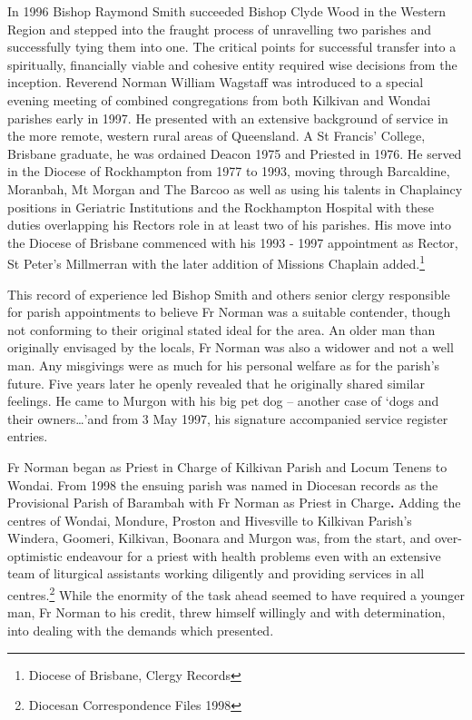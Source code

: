 In 1996 Bishop Raymond Smith succeeded Bishop Clyde Wood in the Western Region and stepped into the fraught process of unravelling two parishes and successfully tying them into one. The critical points for successful transfer into a spiritually, financially viable and cohesive entity required wise decisions from the inception. Reverend Norman William Wagstaff was introduced to a special evening meeting of combined congregations from both Kilkivan and Wondai parishes early in 1997. He presented with an extensive background of service in the more remote, western rural areas of Queensland. A St Francis' College, Brisbane graduate, he was ordained Deacon 1975 and Priested in 1976. He served in the Diocese of Rockhampton from 1977 to 1993, moving through Barcaldine, Moranbah, Mt Morgan and The Barcoo as well as using his talents in Chaplaincy positions in Geriatric Institutions and the Rockhampton Hospital with these duties overlapping his Rectors role in at least two of his parishes. His move into the Diocese of Brisbane commenced with his 1993 - 1997 appointment as Rector, St Peter's Millmerran with the later addition of Missions Chaplain added.\footnote{Diocese of Brisbane, Clergy Records}


This record of experience led Bishop Smith and others senior clergy responsible for parish appointments to believe Fr Norman was a suitable contender, though not conforming to their original stated ideal for the area. An older man than originally envisaged by the locals, Fr Norman was also a widower and not a well man. Any misgivings were as much for his personal welfare as for the parish's future. Five years later he openly revealed that he originally shared similar feelings. He came to Murgon with his big pet dog -- another case of `dogs and their owners\ldots'and from 3 May 1997, his signature accompanied service register entries.



Fr Norman began as Priest in Charge of Kilkivan Parish and Locum Tenens to Wondai. From 1998 the ensuing parish was named in Diocesan records as the Provisional Parish of Barambah with Fr Norman as Priest in Charge\textbf{.} Adding the centres of Wondai, Mondure, Proston and Hivesville to Kilkivan Parish's Windera, Goomeri, Kilkivan, Boonara and Murgon was, from the start, and over-optimistic endeavour for a priest with health problems even with an extensive team of liturgical assistants working diligently and providing services in all centres.\footnote{Diocesan Correspondence Files 1998} While the enormity of the task ahead seemed to have required a younger man, Fr Norman to his credit, threw himself willingly and with determination, into dealing with the demands which presented.


